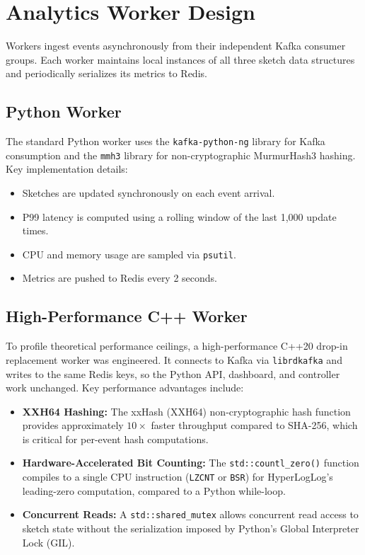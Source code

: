 \section{Analytics Worker Design}

Workers ingest events asynchronously from their independent Kafka consumer groups. Each worker maintains local instances of all three sketch data structures and periodically serializes its metrics to Redis.

\subsection{Python Worker}
The standard Python worker uses the \texttt{kafka-python-ng} library for Kafka consumption and the \texttt{mmh3} library for non-cryptographic MurmurHash3 hashing. Key implementation details:
\begin{itemize}
    \item Sketches are updated synchronously on each event arrival.
    \item P99 latency is computed using a rolling window of the last 1,000 update times.
    \item CPU and memory usage are sampled via \texttt{psutil}.
    \item Metrics are pushed to Redis every 2 seconds.
\end{itemize}

\subsection{High-Performance C++ Worker}
To profile theoretical performance ceilings, a high-performance C++20 drop-in replacement worker was engineered. It connects to Kafka via \texttt{librdkafka} and writes to the same Redis keys, so the Python API, dashboard, and controller work unchanged. Key performance advantages include:

\begin{itemize}
    \item \textbf{XXH64 Hashing:} The xxHash (XXH64) non-cryptographic hash function provides approximately $10\times$ faster throughput compared to SHA-256, which is critical for per-event hash computations.
    \item \textbf{Hardware-Accelerated Bit Counting:} The \texttt{std::countl\_zero()} function compiles to a single CPU instruction (\texttt{LZCNT} or \texttt{BSR}) for HyperLogLog's leading-zero computation, compared to a Python while-loop.
    \item \textbf{Concurrent Reads:} A \texttt{std::shared\_mutex} allows concurrent read access to sketch state without the serialization imposed by Python's Global Interpreter Lock (GIL).
\end{itemize}

